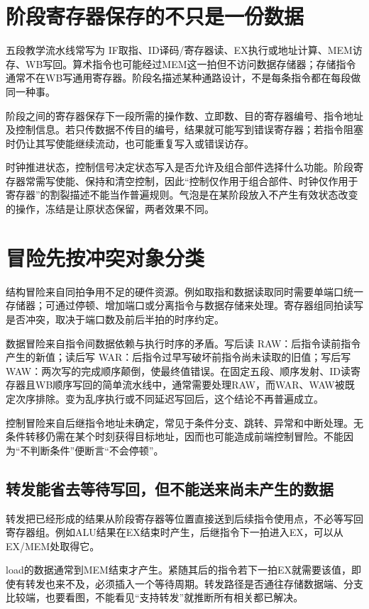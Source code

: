 \section{阶段寄存器保存的不只是一份数据}\label{co-06-02}

五段教学流水线常写为 IF取指、ID译码/寄存器读、EX执行或地址计算、MEM访存、WB写回。算术指令也可能经过MEM这一拍但不访问数据存储器；存储指令通常不在WB写通用寄存器。阶段名描述某种通路设计，不是每条指令都在每段做同一种事。

阶段之间的寄存器保存下一段所需的操作数、立即数、目的寄存器编号、指令地址及控制信息。若只传数据不传目的编号，结果就可能写到错误寄存器；若指令阻塞时仍让其写使能继续流动，也可能重复写入或错误访存。

时钟推进状态，控制信号决定状态写入是否允许及组合部件选择什么功能。阶段寄存器常需写使能、保持和清空控制，因此``控制仅作用于组合部件、时钟仅作用于寄存器''的割裂描述不能当作普遍规则。气泡是在某阶段放入不产生有效状态改变的操作，冻结是让原状态保留，两者效果不同。

\section{冒险先按冲突对象分类}\label{co-06-03}

结构冒险来自同拍争用不足的硬件资源。例如取指和数据读取同时需要单端口统一存储器；可通过停顿、增加端口或分离指令与数据存储来处理。寄存器组同拍读写是否冲突，取决于端口数及前后半拍的时序约定。

数据冒险来自指令间数据依赖与执行时序的矛盾。写后读 RAW：后指令读前指令产生的新值；读后写 WAR：后指令过早写破坏前指令尚未读取的旧值；写后写 WAW：两次写的完成顺序颠倒，使最终值错误。在固定五段、顺序发射、ID读寄存器且WB顺序写回的简单流水线中，通常需要处理RAW，而WAR、WAW被既定次序排除。变为乱序执行或不同延迟写回后，这个结论不再普遍成立。

控制冒险来自后继指令地址未确定，常见于条件分支、跳转、异常和中断处理。无条件转移仍需在某个时刻获得目标地址，因而也可能造成前端控制冒险。不能因为``不判断条件''便断言``不会停顿''。

\subsection{转发能省去等待写回，但不能送来尚未产生的数据}\label{co-c06-h43}

转发把已经形成的结果从阶段寄存器等位置直接送到后续指令使用点，不必等写回寄存器组。例如ALU结果在EX结束时产生，后继指令下一拍进入EX，可以从EX/MEM处取得它。

load的数据通常到MEM结束才产生。紧随其后的指令若下一拍EX就需要该值，即使有转发也来不及，必须插入一个等待周期。转发路径是否通往存储数据端、分支比较端，也要看图，不能看见``支持转发''就推断所有相关都已解决。


